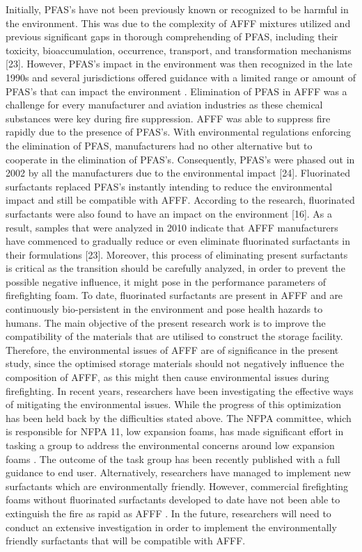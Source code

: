 \documentclass[12pt]{report}
\begin{document}
Initially, PFAS's have not been previously known or recognized to be harmful in the environment. This was due to the complexity of AFFF mixtures utilized and previous significant gaps in thorough comprehending of PFAS, including their toxicity, bioaccumulation, occurrence, transport, and transformation mechanisms [23]. However, PFAS's impact in the environment was then recognized in the late 1990s and several jurisdictions offered guidance with a limited range or amount of PFAS's that can impact the environment \cite{hinnant2017influence}.
Elimination of PFAS in AFFF was a challenge for every manufacturer and aviation industries as these chemical substances were key during fire suppression. AFFF was able to suppress fire rapidly due to the presence of PFAS's. With environmental regulations enforcing the elimination of PFAS, manufacturers had no other alternative but to cooperate in the elimination of PFAS's. Consequently, PFAS's were phased out in 2002 by all the manufacturers due to the environmental impact [24].  Fluorinated surfactants replaced PFAS's instantly intending to reduce the environmental impact and still be compatible with AFFF. 
According to the research, fluorinated surfactants were also found to have an impact on the environment [16]. As a result, samples that were analyzed in 2010 indicate that AFFF manufacturers have commenced to gradually reduce or even eliminate fluorinated surfactants in their formulations [23]. Moreover, this process of eliminating present surfactants is critical as the transition should be carefully analyzed, in order to prevent the possible negative influence, it might pose in the performance parameters of firefighting foam. To date, fluorinated surfactants are present in AFFF and are continuously bio-persistent in the environment and pose health hazards to humans.
The main objective of the present research work is to improve the compatibility of the materials that are utilised to construct the storage facility. Therefore, the environmental issues of AFFF are of significance in the present study, since the optimised storage materials should not negatively influence the composition of AFFF, as this might then cause environmental issues during firefighting. 
In recent years, researchers have been investigating the effective ways of mitigating the environmental issues. While the progress of this optimization has been held back by the difficulties stated above. The NFPA committee, which is responsible for NFPA 11, low expansion foams, has made significant effort in tasking a group to address the environmental concerns around low expansion foams \cite{scheffey1995evaluating}. The outcome of the task group has been recently published with a full guidance to end user\cite{scheffey1995evaluating}. Alternatively, researchers have managed to implement new surfactants which are environmentally friendly. However, commercial firefighting foams without fluorinated surfactants developed to date have not been able to extinguish the fire as rapid as AFFF \cite{hinnant2017influence}. In the future, researchers will need to conduct an extensive investigation in order to implement the environmentally friendly surfactants that will be compatible with AFFF.  
\end{document}
